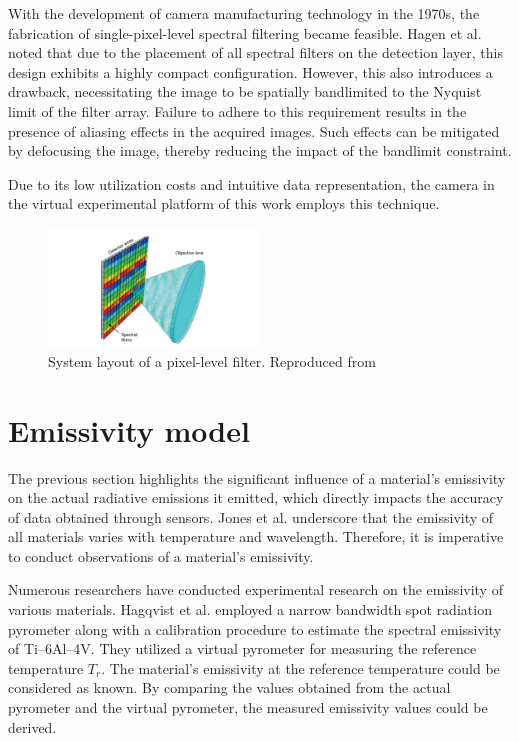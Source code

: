With the development of camera manufacturing technology in the 1970s, 
the fabrication of single-pixel-level spectral filtering became feasible\cite{BAYERB..1976}.
Hagen et al. noted that due to the placement of all spectral filters on the 
detection layer, this design exhibits a highly compact configuration. 
However, this also introduces a drawback, necessitating the image to be 
spatially bandlimited to the Nyquist limit of the filter array. 
Failure to adhere to this requirement results in the presence of 
aliasing effects in the acquired images. Such effects can be mitigated 
by defocusing the image, thereby reducing the impact of the bandlimit 
constraint\cite{Hagen.2013}.


Due to its low utilization costs and intuitive data representation, the 
camera in the virtual experimental platform of this work employs this 
technique.

\begin{figure}[htbp]
    \centering
    \includegraphics[width=0.5\textwidth]{figures/pixel_level_filter.pdf}
    \caption{System layout of a pixel-level filter. Reproduced from \cite{Hagen.2013}}
    \label{fig: pixel_filter}
\end{figure}

%
%
\section{Emissivity model}%
The previous section highlights the significant influence of a 
material's emissivity on the actual radiative emissions it emitted, 
which directly impacts the accuracy of data obtained through sensors. 
Jones et al. underscore that the emissivity of all materials varies 
with temperature and wavelength\cite{Jones.2019}. Therefore, it is 
imperative to conduct observations of a material's emissivity.


Numerous researchers have conducted experimental research on the 
emissivity of various materials. Hagqvist et al. employed a narrow 
bandwidth spot radiation pyrometer along with a calibration procedure 
to estimate the spectral emissivity of Ti–6Al–4V\cite{Hagqvist.2013}. 
They utilized a virtual pyrometer for measuring the reference temperature $T_r$. 
The material's emissivity at the reference temperature could be considered 
as known. By comparing the values obtained from the actual pyrometer and 
the virtual pyrometer, the measured emissivity values could be derived.


